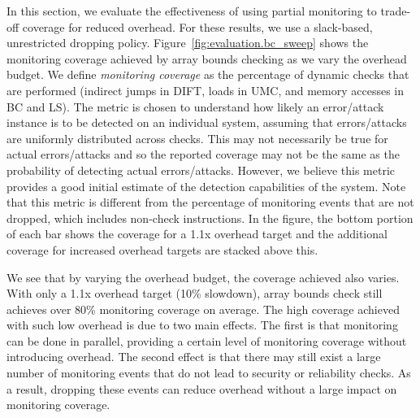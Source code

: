 In this section, we evaluate the effectiveness of
using partial monitoring to trade-off coverage for reduced overhead.
For these results, we use a slack-based, unrestricted dropping policy.
Figure~\ref{fig:evaluation.bc_sweep} shows the monitoring coverage achieved by
array bounds checking as we vary the overhead budget. 
We define \emph{monitoring coverage} as the 
percentage of dynamic checks that are performed 
(indirect jumps in DIFT, loads in UMC, and memory accesses in BC and LS). 
The metric is chosen to understand
how likely an error/attack instance is to be detected on an individual system, 
assuming that errors/attacks are uniformly distributed across checks. This may
not necessarily be true for actual errors/attacks and so the reported coverage
may not be the same as the probability of detecting actual errors/attacks.
However, we believe this metric
provides a good initial estimate of the detection capabilities of the system.
Note that this metric is different from the
percentage of monitoring events that are not dropped, which includes
non-check instructions.
In the figure, the bottom portion of each
bar shows the coverage for a 1.1x overhead target and the additional
coverage for increased overhead targets are stacked above this.

We see that by varying the overhead budget, the coverage achieved also varies.
With only a 1.1x overhead target (10\% slowdown), array bounds check still
achieves over 80\% monitoring coverage on average. The high coverage
achieved with such low overhead is due to two main effects.  The first is that
monitoring can be done in parallel, providing a certain level of monitoring coverage without
introducing overhead. The second effect is that there may still exist a large number of
monitoring events that do not lead to security or reliability checks. As a
result, dropping these events can reduce overhead without a large impact on
monitoring coverage.

